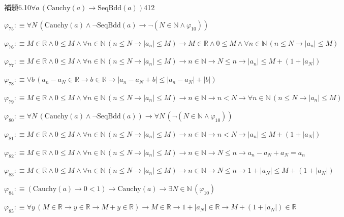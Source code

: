 \begin{fullproof}{補題6.10}{$\forall a\,(\mathrm{Cauchy}(a) \to \mathrm{SeqBdd}(a))$}{412}
\begin{abbrevlist}
\item $\varphi_{75} :\equiv \forall N\,(\mathrm{Cauchy}(a) \land \neg \mathrm{SeqBdd}(a) \to \neg (N \in \mathbb{N} \land \varphi_{10}))$
\item $\varphi_{76} :\equiv M \in \mathbb{R} \land 0 \leq M \land \forall n \in \mathbb{N}\,(n \leq N \to \lvert a_{n} \rvert \leq M) \to M \in \mathbb{R} \land 0 \leq M \land \forall n \in \mathbb{N}\,(n \leq N \to \lvert a_{n} \rvert \leq M)$
\item $\varphi_{77} :\equiv M \in \mathbb{R} \land 0 \leq M \land \forall n \in \mathbb{N}\,(n \leq N \to \lvert a_{n} \rvert \leq M) \to n \in \mathbb{N} \to N \leq n \to \lvert a_{n} \rvert \leq M + (1 + \lvert a_{N} \rvert)$
\item $\varphi_{78} :\equiv \forall b\,(a_{n} - a_{N} \in \mathbb{R} \to b \in \mathbb{R} \to \lvert a_{n} - a_{N} + b \rvert \leq \lvert a_{n} - a_{N} \rvert + \lvert b \rvert)$
\item $\varphi_{79} :\equiv M \in \mathbb{R} \land 0 \leq M \land \forall n \in \mathbb{N}\,(n \leq N \to \lvert a_{n} \rvert \leq M) \to n \in \mathbb{N} \to n < N \to \forall n \in \mathbb{N}\,(n \leq N \to \lvert a_{n} \rvert \leq M)$
\item $\varphi_{80} :\equiv \forall N\,(\mathrm{Cauchy}(a) \land \neg \mathrm{SeqBdd}(a)) \to \forall N\,(\neg (N \in \mathbb{N} \land \varphi_{10}))$
\item $\varphi_{81} :\equiv M \in \mathbb{R} \land 0 \leq M \land \forall n \in \mathbb{N}\,(n \leq N \to \lvert a_{n} \rvert \leq M) \to n \in \mathbb{N} \to n < N \to \lvert a_{n} \rvert \leq M + (1 + \lvert a_{N} \rvert)$
\item $\varphi_{82} :\equiv M \in \mathbb{R} \land 0 \leq M \land \forall n \in \mathbb{N}\,(n \leq N \to \lvert a_{n} \rvert \leq M) \to n \in \mathbb{N} \to N \leq n \to a_{n} - a_{N} + a_{N} = a_{n}$
\item $\varphi_{83} :\equiv M \in \mathbb{R} \land 0 \leq M \land \forall n \in \mathbb{N}\,(n \leq N \to \lvert a_{n} \rvert \leq M) \to n \in \mathbb{N} \to N \leq n \to 1 + \lvert a_{N} \rvert \leq M + (1 + \lvert a_{N} \rvert)$
\item $\varphi_{84} :\equiv (\mathrm{Cauchy}(a) \to 0 < 1) \to \mathrm{Cauchy}(a) \to \exists N \in \mathbb{N}\,(\varphi_{10})$
\item $\varphi_{85} :\equiv \forall y\,(M \in \mathbb{R} \to y \in \mathbb{R} \to M + y \in \mathbb{R}) \to M \in \mathbb{R} \to 1 + \lvert a_{N} \rvert \in \mathbb{R} \to M + (1 + \lvert a_{N} \rvert) \in \mathbb{R}$

\end{abbrevlist}
\end{fullproof}

